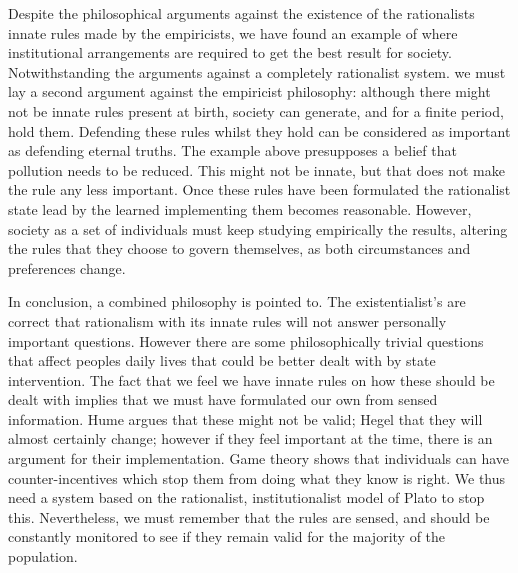 Despite the philosophical arguments against the existence of the rationalists innate rules made by the empiricists, we have found an example of where institutional arrangements are required to get the best result for society. Notwithstanding the arguments against a completely rationalist system. we must lay a second argument against the empiricist philosophy: although there might not be innate rules present at birth, society can generate, and for a finite period, hold them. Defending these rules whilst they hold can be considered as important as defending eternal truths. The example above presupposes a belief that pollution needs to be reduced. This might not be innate, but that does not make the rule any less important. Once these rules have been formulated the rationalist state lead by the learned implementing them becomes reasonable. However, society as a set of individuals must keep studying empirically the results, altering the rules that they choose to govern themselves, as both circumstances and preferences change.

In conclusion, a combined philosophy is pointed to. The existentialist's are correct that rationalism with its innate rules will not answer personally important questions. However there are some philosophically trivial questions that affect peoples daily lives that could be better dealt with by state intervention. The fact that we feel we have innate rules on how these should be dealt with implies that we must have formulated our own from sensed information. Hume argues that these might not be valid; Hegel that they will almost certainly change; however if they feel important at the time, there is an argument for their implementation. Game theory shows that individuals can have counter-incentives which stop them from doing what they know is right. We thus need a system based on the rationalist, institutionalist model of Plato to stop this. Nevertheless, we must remember that the rules are sensed, and should be constantly monitored to see if they remain valid for the majority of the population.